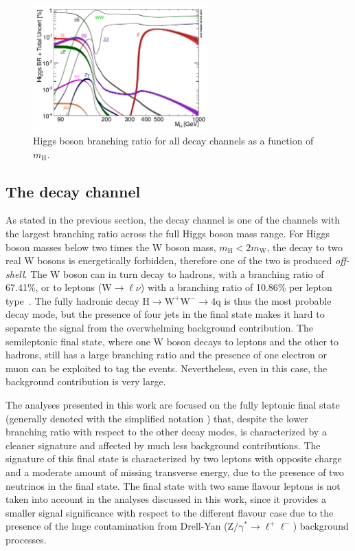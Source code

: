 \begin{figure}[htb]
\centering
\includegraphics[width=0.6\textwidth]{images/Higgs_BR.pdf}
\caption{Higgs boson branching ratio for all decay channels as a function of $m_\mathrm{H}$.}\label{fig:higgs_br}
\end{figure}



\subsection{The \hww decay channel}\label{sec:HWW}
As stated in the previous section, the \hww decay channel is one of the channels with the largest branching ratio across the full Higgs boson mass range. For Higgs boson masses below two times the W boson mass, $m_\mathrm{H} < 2m_\mathrm{W}$, the decay to two real W bosons is energetically forbidden, therefore one of the two is produced \emph{off-shell}. The W boson can in turn decay to hadrons, with a branching ratio of 67.41\%, or to leptons ($\mathrm{W}\to\ell\nu$) with a branching ratio of 10.86\% per lepton type~\cite{pdg2016}. The fully hadronic decay $\mathrm{H\to W^+W^- \to 4q}$ is thus the most probable decay mode, but the presence of four jets in the final state makes it hard to separate the signal from the overwhelming background contribution. The semileptonic final state, where one W boson decays to leptons and the other to hadrons, still has a large branching ratio and the presence of one electron or muon can be exploited to tag the events. Nevertheless, even in this case, the background contribution is very large.

The analyses presented in this work are focused on the fully leptonic final state (generally denoted with the simplified notation \hwwllnn) that, despite the lower branching ratio with respect to the other decay modes, is characterized by a cleaner signature and affected by much less background contributions. The signature of this final state is characterized by two leptons with opposite charge and a moderate amount of missing transverse energy, due to the presence of two neutrinos in the final state. The final state with two same flavour leptons is not taken into account in the analyses discussed in this work, since it provides a smaller signal significance with respect to the different flavour case due to the presence of the huge contamination from Drell-Yan ($\mathrm{Z/\gamma^* \to \ell^+\ell^-}$) background processes.


